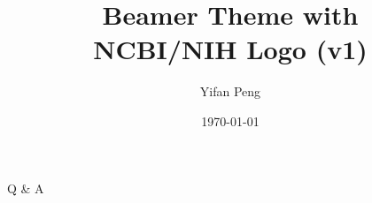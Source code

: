 \documentclass{beamer}
\title{Beamer Theme with \\NCBI/NIH Logo (v1)}
\author[Yifan Peng]{Yifan Peng}
\institute[NCBI/NIH]{NCBI/NIH}
\date[today]{\today}
\begin{document}
\begin{frame}[plain]
    \titlepage
\end{frame}

\begin{frame}
	\frametitle{\;}
  \begin{center}
    \huge Q \& A \vspace{1em}
  \end{center}
\end{frame}
\end{document}
